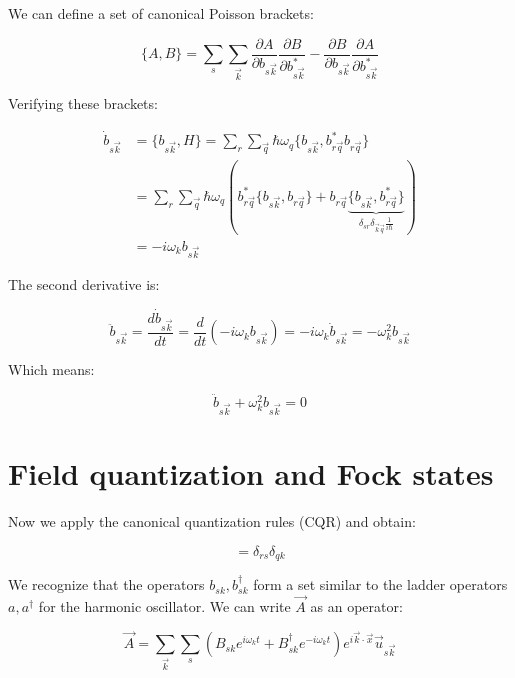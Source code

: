 We can define a set of canonical Poisson brackets:

\begin{equation}
\{A,B\}=\sum_s\sum_{\vec{k}}\frac{\partial A}{\partial b_{s\vec{k}}}\frac{\partial B}{\partial b_{s\vec{k}}^*}-\frac{\partial B}{\partial b_{s\vec{k}}}\frac{\partial A}{\partial b_{s\vec{k}}^*}
\end{equation}

Verifying these brackets:

\begin{align}
\dot{b}_{s\vec{k}}&=\{b_{s\vec{k}},H\}=\sum_r\sum_{\vec{q}}\hbar\omega_q\{b_{s\vec{k}},b_{r\vec{q}}^*b_{r\vec{q}}\}\\
&=\sum_r\sum_{\vec{q}}\hbar\omega_q(b_{r\vec{q}}^*\{b_{s\vec{k}},b_{r\vec{q}}\}+b_{r\vec{q}}\underbrace{\{b_{s\vec{k}},b_{r\vec{q}}^*\}}_{\delta_{sr}\delta_{\vec{k}\vec{q}}\frac{1}{i\hbar}}) \\
&=-i\omega_kb_{s\vec{k}}
\end{align}

The second derivative is:

\begin{equation}
\ddot{b}_{s\vec{k}}=\frac{d\dot{b}_{s\vec{k}}}{dt}=\frac{d}{dt}(-i\omega_kb_{s\vec{k}})=-i\omega_k\dot{b}_{s\vec{k}}=-\omega_k^2b_{s\vec{k}}
\end{equation}

Which means:

\begin{equation}
\ddot{b}_{s\vec{k}}+\omega_k^2b_{s\vec{k}}=0
\end{equation}

\section{Field quantization and Fock states}
Now we apply the canonical quantization rules (CQR) and obtain:

\begin{equation}
[b_{sk},b_{rq}^\dagger]=\delta_{rs}\delta_{qk}
\end{equation}

We recognize that the operators $b_{sk}, b_{sk}^\dagger$ form a set similar to the ladder operators $a, a^\dagger$ for the harmonic oscillator. We can write $\vec{A}$ as an operator:

\begin{equation}
\vec{A}=\sum_{\vec{k}}\sum_s(B_{sk}e^{i\omega_k t}+B_{sk}^\dagger e^{-i\omega_k t})e^{i\vec{k}\cdot\vec{x}}\vec{u}_{s\vec{k}}
\end{equation}

